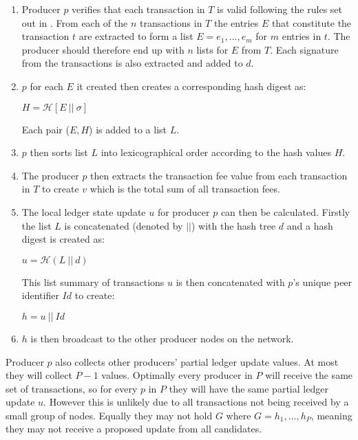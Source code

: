 \begin{enumerate}
\item Producer $p$ verifies that each transaction in $T$ is valid following the rules set out in \cite{transactionvalidator}. From each of the $n$ transactions in $T$ the entries $E$ that constitute the transaction $t$ are extracted to form a list $E = e_1,...,e_m$ for $m$ entries in $t$. The producer should therefore end up with $n$ lists for $E$ from $T$. Each signature from the transactions is also extracted and added to $d$.

\item $p$ for each $E$ it created then creates a corresponding hash digest as:
\begin{center}
$H = \mathcal{H}[E~||~\sigma]$
\end{center}

Each pair ($E,H$) is added to a list $L$.

\item $p$ then sorts list $L$ into lexicographical order according to the hash values $H$.

\item The producer $p$ then extracts the transaction fee value from each transaction in $T$ to create $v$ which is the total sum of all transaction fees.

\item The local ledger state update $u$ for producer $p$ can then be calculated. Firstly the list $L$ is concatenated (denoted by $||$) with the hash tree $d$ and a hash digest is created as:

\begin{center}
$u = \mathcal{H}(L~||~d)$
\end{center}

This list summary of transactions $u$ is then concatenated with $p$'s unique peer identifier $Id$ to create:

\begin{center}
$h = u ~||~Id$
\end{center}

\item $h$ is then broadcast to the other producer nodes on the network.
\end{enumerate}

Producer $p$ also collects other producers' partial ledger update values. At most they will collect $P-1$ values. Optimally every producer in $P$ will receive the same set of transactions, so for every $p$ in $P$ they will have the same partial ledger update $u$. However this is unlikely due to all transactions not being received by a small group of nodes. Equally they may not hold $G$ where $G = h_1,...,h_P$, meaning they may not receive a proposed update from all candidates.
